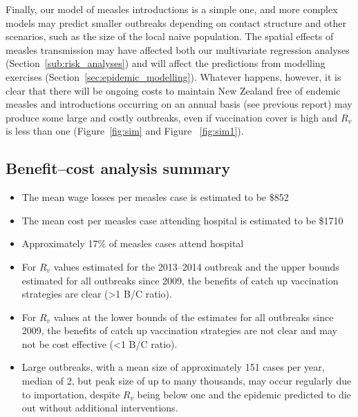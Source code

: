 \documentclass{article}
\begin{document}
Finally, our model of measles introductions is a simple one, and more complex models may predict smaller outbreaks depending on contact structure and other scenarios, such as the size of the local naive population. The spatial effects of measles transmission may have affected both our multivariate regression analyses (Section~\ref{sub:risk_analyses}) and will affect the predictions from modelling exercises (Section~\ref{sec:epidemic_modelling}). Whatever happens, however, it is clear that there will be ongoing costs to maintain New Zealand free of endemic measles and introductions occurring on an annual basis (see previous report) may produce some large and costly outbreaks, even if vaccination cover is high and $R_v$ is less than one (Figure~\ref{fig:sim} and Figure ~\ref{fig:sim1}).

\subsection{Benefit--cost analysis summary}
\begin{itemize}
\item The mean wage losses per measles case is estimated to be \$852
\item The mean cost per measles case attending hospital is estimated to be \$1710
\item Approximately 17\% of measles cases attend hospital
\item For $R_v$ values estimated for the 2013--2014 outbreak and the upper bounds estimated for all outbreaks since 2009, the benefits of catch up vaccination strategies are clear (>1 B/C ratio).
\item For $R_v$ values at the lower bounds of the estimates for all outbreaks since 2009, the benefits of catch up vaccination strategies are not clear and may not be cost effective (<1 B/C ratio).
\item Large outbreaks, with a mean size of approximately 151 cases per year, median of 2, but peak size of up to many thousands, may occur regularly due to importation, despite $R_v$ being below one and the epidemic predicted to die out without additional interventions.
\end{itemize}
\end{document}

